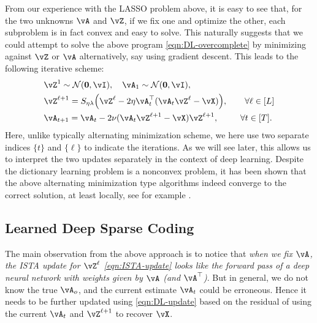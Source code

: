 \documentclass[../../book-main.tex]{subfiles}
\begin{document}
From our experience with the LASSO problem above, it is easy to see that, for the two unknowns \(\vA\) and \(\vZ\), if we fix one and optimize the other, each subproblem is in fact convex and easy to solve. This naturally suggests that we could attempt to solve the above program \eqref{eqn:DL-overcomplete} by minimizing against \(\vZ\) or \(\vA\) alternatively, say using gradient descent. This leads to the following iterative scheme:
\begin{align}
    & \vZ^{1}
     \sim \dNorm(\vzero, \vI), \quad \vA_{1}
     \sim \dNorm(\vzero, \vI), \\ 
    &\vZ^{\ell + 1} = S_{\eta\lambda}\rp{\vZ^{\ell} - 2\eta\vA_{t}^{\top}(\vA_{t}\vZ^{\ell} - \vX)}, \qquad \forall \ell \in [L] \label{eqn:ISTA-update}\\ 
    &\vA_{t + 1} = \vA_{t} - 2\nu (\vA_{t}\vZ^{\ell + 1} - \vX)\vZ^{\ell + 1}, \qquad\;\; \forall t \in [T].\label{eqn:DL-update}
\end{align}
Here, unlike typically alternating minimization scheme, we here use two separate indices $\{t\}$ and $\{\ell\}$ to indicate the iterations. As we will see later, this allows us to interpret the two updates separately in the context of deep learning. Despite the dictionary learning problem is a nonconvex problem, it has been shown that the above alternating minimization type algorithms indeed converge to the correct solution, at least locally, see for example \cite{alekh-2016}.


\subsection{Learned Deep Sparse Coding}
\label{sec:LISTA}
The main observation from the above approach is to notice that \textit{when we fix \(\vA\), the ISTA update for $\vZ^\ell$ \eqref{eqn:ISTA-update} looks like the forward pass of a deep neural network with weights given by \(\vA\) (and \(\vA^{\top}\))}. But in general, we do not know the true $\vA_o$, and the current estimate $\vA_t$ could be erroneous. Hence it needs to be further updated using \eqref{eqn:DL-update} based on the residual of using the current $\vA_t$ and $\vZ^{\ell +1}$ to recover $\vX$. 
\end{document}
